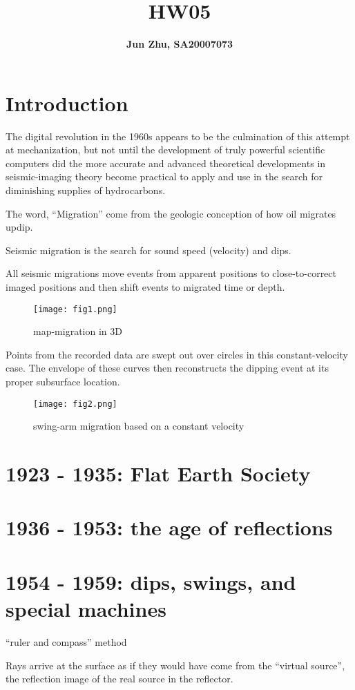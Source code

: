 \documentclass{article}
\title{\textbf{HW05}}
\author{\textbf{Jun Zhu, SA20007073}}
\begin{document}
\maketitle
\section{Introduction}
The digital revolution in the 1960s
appears to be the culmination of this attempt at mechanization, but not until the development of truly powerful scientific computers did the more accurate and advanced theoretical developments in seismic-imaging theory become practical to apply and use in the search for diminishing supplies of hydrocarbons.\par
The word, ``Migration'' come from the geologic conception of how oil migrates updip.\par
Seismic migration is the search for sound speed (velocity) and dips.\par
All seismic migrations move events from apparent positions to close-to-correct imaged positions and then shift events to migrated time or depth.\par
\begin{figure}[H]
\centering
\texttt{[image: fig1.png]}
\caption{map-migration in 3D}
\end{figure}
Points from the recorded data are swept out over circles in this constant-velocity case. The envelope of these curves then reconstructs the dipping event at its proper subsurface location.\par
\begin{figure}[H]
\centering
\texttt{[image: fig2.png]}
\caption{swing-arm migration based on a constant velocity}
\end{figure}
\section{1923 - 1935: Flat Earth Society}
\section{1936 - 1953: the age of reflections}
\section{1954 - 1959: dips, swings, and special machines}
``ruler and compass'' method\par
Rays arrive at the surface as if they would have come from the ``virtual source'', the reflection image of the real source in the reflector.\par
\end{document}
